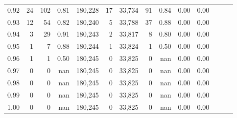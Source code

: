 \begin{tabular}{rrrrrrrrrrrrrr}
0.92 &     24 &  102 &  0.81 &  180,228 &       17 &  33,734 &      91 &  0.84 &  0.00 &      0.00 \\
0.93 &     12 &   54 &  0.82 &  180,240 &        5 &  33,788 &      37 &  0.88 &  0.00 &      0.00 \\
0.94 &      3 &   29 &  0.91 &  180,243 &        2 &  33,817 &       8 &  0.80 &  0.00 &      0.00 \\
0.95 &      1 &    7 &  0.88 &  180,244 &        1 &  33,824 &       1 &  0.50 &  0.00 &      0.00 \\
0.96 &      1 &    1 &  0.50 &  180,245 &        0 &  33,825 &       0 &   nan &  0.00 &      0.00 \\
0.97 &      0 &    0 &   nan &  180,245 &        0 &  33,825 &       0 &   nan &  0.00 &      0.00 \\
0.98 &      0 &    0 &   nan &  180,245 &        0 &  33,825 &       0 &   nan &  0.00 &      0.00 \\
0.99 &      0 &    0 &   nan &  180,245 &        0 &  33,825 &       0 &   nan &  0.00 &      0.00 \\
1.00 &      0 &    0 &   nan &  180,245 &        0 &  33,825 &       0 &   nan &  0.00 &      0.00 \\
\bottomrule
\end{tabular}
